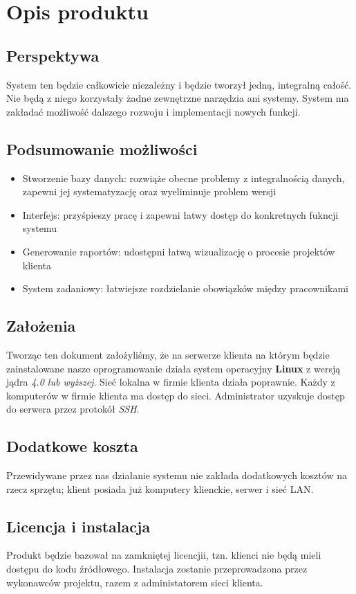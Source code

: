 \documentclass{article}
\begin{document}
\section{Opis produktu}
\subsection{Perspektywa}
System ten będzie całkowicie niezależny i będzie tworzył jedną, integralną całość.
Nie będą z niego korzystały żadne zewnętrzne narzędzia ani systemy.
System ma zakładać możliwość dalszego rozwoju i implementacji nowych funkcji.
\subsection{Podsumowanie możliwości}
\begin{itemize}
    \item Stworzenie bazy danych: rozwiąże obecne problemy z integralnością danych, zapewni jej systematyzację oraz wyeliminuje problem wersji
    \item Interfejs: przyśpieszy pracę i zapewni łatwy dostęp do konkretnych fukncji systemu
    \item Generowanie raportów: udostępni łatwą wizualizację o procesie projektów klienta
    \item System zadaniowy: łatwiejsze rozdzielanie obowiązków między pracownikami
\end{itemize}
\subsection{Założenia}
Tworząc ten dokument założyliśmy, że na serwerze klienta na którym będzie zainstalowane nasze oprogramowanie
działa system operacyjny \textbf{Linux} z wersją jądra \textit{4.0 lub wyższej}. Sieć lokalna w firmie klienta działa poprawnie.
Każdy z komputerów w firmie klienta ma dostęp do sieci. Administrator uzyskuje dostęp do serwera przez protokół \textit{SSH}. 
\subsection{Dodatkowe koszta}
Przewidywane przez nas działanie systemu nie zakłada dodatkowych kosztów na rzecz sprzętu;
klient posiada już komputery klienckie, serwer i sieć LAN.
\subsection{Licencja i instalacja}
Produkt będzie bazował na zamkniętej licencjii, tzn. klienci nie będą mieli dostępu do kodu źródłowego.
Instalacja zostanie przeprowadzona przez wykonawców projektu, razem z administatorem sieci klienta.
\newpage
\end{document}

